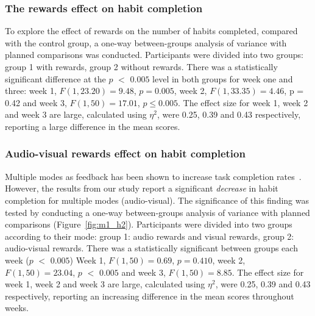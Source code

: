\documentclass{scaffold/sigchi}
\begin{document}


\subsubsection{The rewards effect on habit completion}
To explore the effect of rewards on the number of habits completed, compared with the control group, a one-way between-groups analysis of variance with planned comparisons was conducted. Participants were divided into two groups: group 1 with rewards, group 2 without rewards. There was a statistically significant difference at the $p$ $<$ $0.005$ level in both groups for week one and three: week 1, $F(1,23.20) = 9.48$, $p = 0.005$, week 2, $F(1,33.35) = 4.46$, p = 0.42 and week 3, $F(1,50) = 17.01$, $p\leq 0.005$. The effect size for week 1, week 2 and week 3 are large, calculated using $\eta^{2}$, were 0.25, 0.39 and 0.43 respectively, reporting a large difference in the mean scores.

\subsubsection{Audio-visual rewards effect on habit completion}
Multiple modes as feedback has been shown to increase task completion rates~\cite{comparing_modalities_effects_of_visual_auditory, benefits_of_audio_visual_1, benefits_of_audio_visual_2}. However, the results from our study report a significant \textit{decrease} in habit completion for multiple modes (audio-visual). The significance of this finding was tested by conducting a one-way between-groups analysis of variance with planned comparisons (Figure~\ref{fig:m1_h2}). Participants were divided into two groups according to their mode: group 1: audio rewards and visual rewards, group 2: audio-visual rewards. There was a statistically significant  between groups each week ($p$ $<$ $0.005$) Week 1, $F(1,50) = 0.69$, $p = 0.410$, week 2, $F(1,50) = 23.04$, $p$ $<$ $0.005$ and week 3, $F(1,50) = 8.85$. The effect size for week 1, week 2 and week 3 are large, calculated using $\eta^{2}$, were 0.25, 0.39 and 0.43 respectively, reporting an increasing difference in the mean scores throughout weeks.
\end{document}
